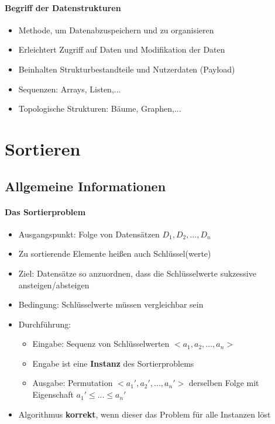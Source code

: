 \paragraph{Begriff der Datenstrukturen}
	\begin{itemize}
		\item Methode, um Datenabzuspeichern und zu organisieren
		\item Erleichtert Zugriff auf Daten und Modifikation der Daten
		\item Beinhalten Strukturbestandteile und Nutzerdaten (Payload)
		\item Sequenzen: Arrays, Listen,...
		\item Topologische Strukturen: Bäume, Graphen,... 
    \end{itemize}
    
\section{Sortieren}

\subsection{Allgemeine Informationen}

\paragraph{Das Sortierproblem} 
    \begin{itemize}
        \item Ausgangspunkt: Folge von Datensätzen $D_1,D_2,...,D_n$
        \item Zu sortierende Elemente heißen auch Schlüssel(werte)
        \item Ziel: Datensätze so anzuordnen, dass die Schlüsselwerte sukzessive ansteigen/absteigen
        \item Bedingung: Schlüsselwerte müssen vergleichbar sein
        \item Durchführung:
            \begin{itemize}
                \item Eingabe: Sequenz von Schlüsselwerten $<a_1,a_2,...,a_n>$
                \item Engabe ist eine \textbf{Instanz} des Sortierproblems
                \item Ausgabe: Permutation $<a_1', a_2', ..., a_n'>$ derselben Folge mit Eigenschaft $a_1' \leq ... \leq a_n'$
            \end{itemize}
        \item Algorithmus \textbf{korrekt}, wenn dieser das Problem für alle Instanzen löst
    \end{itemize}

